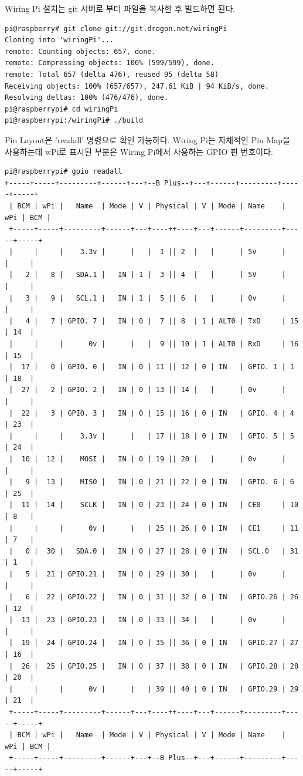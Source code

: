 \documentclass[11pt
  , a4paper
  , article
  , oneside
]{memoir}
\begin{document}
Wiring Pi 설치는 git 서버로 부터 파일을 복사한 후 빌드하면 된다.
\begin{lstlisting}[style=termstyle]
pi@raspberry# git clone git://git.drogon.net/wiringPi
Cloning into 'wiringPi'...
remote: Counting objects: 657, done.
remote: Compressing objects: 100% (599/599), done.
remote: Total 657 (delta 476), reused 95 (delta 58)
Receiving objects: 100% (657/657), 247.61 KiB | 94 KiB/s, done.
Resolving deltas: 100% (476/476), done.
pi@raspberrypi# cd wiringPi
pi@raspberrypi:/wiringPi# ./build
\end{lstlisting}
Pin Layout은 'readall' 명령으로 확인 가능하다. Wiring Pi는 자체적인 Pin Map을 사용하는데 wPi로 
표시된 부분은 Wiring Pi에서 사용하는 GPIO 핀 번호이다.
\begin{lstlisting}[style=termstyle]
pi@raspberrypi# gpio readall
+-----+-----+---------+------+---+--B Plus--+---+------+---------+-----+-----+
 | BCM | wPi |   Name  | Mode | V | Physical | V | Mode | Name    | wPi | BCM |
 +-----+-----+---------+------+---+----++----+---+------+---------+-----+-----+
 |     |     |    3.3v |      |   |  1 || 2  |   |      | 5v      |     |     |
 |   2 |   8 |   SDA.1 |   IN | 1 |  3 || 4  |   |      | 5V      |     |     |
 |   3 |   9 |   SCL.1 |   IN | 1 |  5 || 6  |   |      | 0v      |     |     |
 |   4 |   7 | GPIO. 7 |   IN | 0 |  7 || 8  | 1 | ALT0 | TxD     | 15  | 14  |
 |     |     |      0v |      |   |  9 || 10 | 1 | ALT0 | RxD     | 16  | 15  |
 |  17 |   0 | GPIO. 0 |   IN | 0 | 11 || 12 | 0 | IN   | GPIO. 1 | 1   | 18  |
 |  27 |   2 | GPIO. 2 |   IN | 0 | 13 || 14 |   |      | 0v      |     |     |
 |  22 |   3 | GPIO. 3 |   IN | 0 | 15 || 16 | 0 | IN   | GPIO. 4 | 4   | 23  |
 |     |     |    3.3v |      |   | 17 || 18 | 0 | IN   | GPIO. 5 | 5   | 24  |
 |  10 |  12 |    MOSI |   IN | 0 | 19 || 20 |   |      | 0v      |     |     |
 |   9 |  13 |    MISO |   IN | 0 | 21 || 22 | 0 | IN   | GPIO. 6 | 6   | 25  |
 |  11 |  14 |    SCLK |   IN | 0 | 23 || 24 | 0 | IN   | CE0     | 10  | 8   |
 |     |     |      0v |      |   | 25 || 26 | 0 | IN   | CE1     | 11  | 7   |
 |   0 |  30 |   SDA.0 |   IN | 0 | 27 || 28 | 0 | IN   | SCL.0   | 31  | 1   |
 |   5 |  21 | GPIO.21 |   IN | 0 | 29 || 30 |   |      | 0v      |     |     |
 |   6 |  22 | GPIO.22 |   IN | 0 | 31 || 32 | 0 | IN   | GPIO.26 | 26  | 12  |
 |  13 |  23 | GPIO.23 |   IN | 0 | 33 || 34 |   |      | 0v      |     |     |
 |  19 |  24 | GPIO.24 |   IN | 0 | 35 || 36 | 0 | IN   | GPIO.27 | 27  | 16  |
 |  26 |  25 | GPIO.25 |   IN | 0 | 37 || 38 | 0 | IN   | GPIO.28 | 28  | 20  |
 |     |     |      0v |      |   | 39 || 40 | 0 | IN   | GPIO.29 | 29  | 21  |
 +-----+-----+---------+------+---+----++----+---+------+---------+-----+-----+
 | BCM | wPi |   Name  | Mode | V | Physical | V | Mode | Name    | wPi | BCM |
 +-----+-----+---------+------+---+--B Plus--+---+------+---------+-----+-----+
\end{lstlisting}
\end{document}
